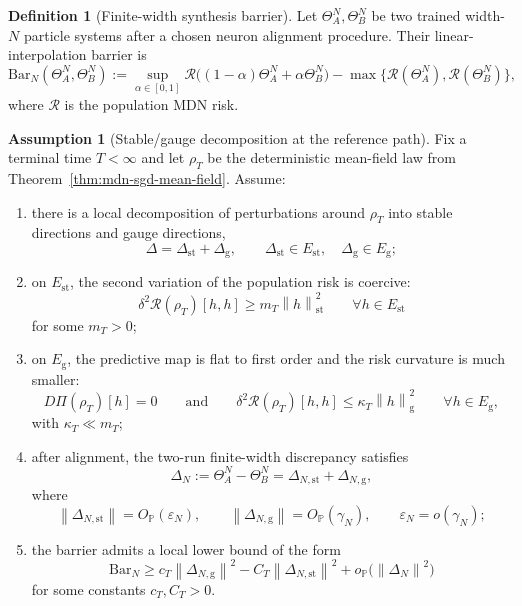 \documentclass[11pt]{article}
\theoremstyle{definition}
\newtheorem{definition}[theorem]{Definition}
\newtheorem{assumption}[theorem]{Assumption}
\newcommand{\Prob}{\mathbb{P}}
\newcommand{\norm}[1]{\left\lVert #1 \right\rVert}
\newcommand{\mc}[1]{\mathcal{#1}}
\begin{document}
\begin{definition}[Finite-width synthesis barrier]
Let $\Theta_A^N,\Theta_B^N$ be two trained width-$N$ particle systems after a
chosen neuron alignment procedure. Their linear-interpolation barrier is
\[
  \mathrm{Bar}_N(\Theta_A^N,\Theta_B^N)
  :=
  \sup_{\alpha\in[0,1]}
  \mc{R}\big((1-\alpha)\Theta_A^N+\alpha \Theta_B^N\big)
  -
  \max\{\mc{R}(\Theta_A^N),\mc{R}(\Theta_B^N)\},
\]
where $\mc{R}$ is the population MDN risk.
\end{definition}

\begin{assumption}[Stable/gauge decomposition at the reference path]
\label{ass:gauge-dominance}
Fix a terminal time $T<\infty$ and let $\rho_T$ be the deterministic mean-field
law from Theorem~\ref{thm:mdn-sgd-mean-field}. Assume:
\begin{enumerate}[label=(GD\arabic*)]
  \item there is a local decomposition of perturbations around $\rho_T$ into
  stable directions and gauge directions,
  \[
    \Delta = \Delta_{\mathrm{st}}+\Delta_{\mathrm{g}},
    \qquad
    \Delta_{\mathrm{st}}\in E_{\mathrm{st}},
    \quad
    \Delta_{\mathrm{g}}\in E_{\mathrm{g}};
  \]
  \item on $E_{\mathrm{st}}$, the second variation of the population risk is
  coercive:
  \[
    \delta^2 \mc{R}(\rho_T)[h,h]
    \ge
    m_T \norm{h}_{\mathrm{st}}^2
    \qquad \forall h\in E_{\mathrm{st}}
  \]
  for some $m_T>0$;
  \item on $E_{\mathrm{g}}$, the predictive map is flat to first order and the
  risk curvature is much smaller:
  \[
    D\Pi(\rho_T)[h]=0
    \qquad\text{and}\qquad
    \delta^2 \mc{R}(\rho_T)[h,h]
    \le
    \kappa_T \norm{h}_{\mathrm{g}}^2
    \qquad \forall h\in E_{\mathrm{g}},
  \]
  with $\kappa_T\ll m_T$;
  \item after alignment, the two-run finite-width discrepancy satisfies
  \[
    \Delta_N
    :=
    \Theta_A^N-\Theta_B^N
    =
    \Delta_{N,\mathrm{st}}+\Delta_{N,\mathrm{g}},
  \]
  where
  \[
    \norm{\Delta_{N,\mathrm{st}}}=O_{\Prob}(\varepsilon_N),
    \qquad
    \norm{\Delta_{N,\mathrm{g}}}=O_{\Prob}(\gamma_N),
    \qquad
    \varepsilon_N=o(\gamma_N);
  \]
  \item the barrier admits a local lower bound of the form
  \[
    \mathrm{Bar}_N
    \ge
    c_T \norm{\Delta_{N,\mathrm{g}}}^2
    -
    C_T \norm{\Delta_{N,\mathrm{st}}}^2
    +
    o_{\Prob}\!\big(\norm{\Delta_N}^2\big)
  \]
  for some constants $c_T,C_T>0$.
\end{enumerate}
\end{assumption}
\end{document}
